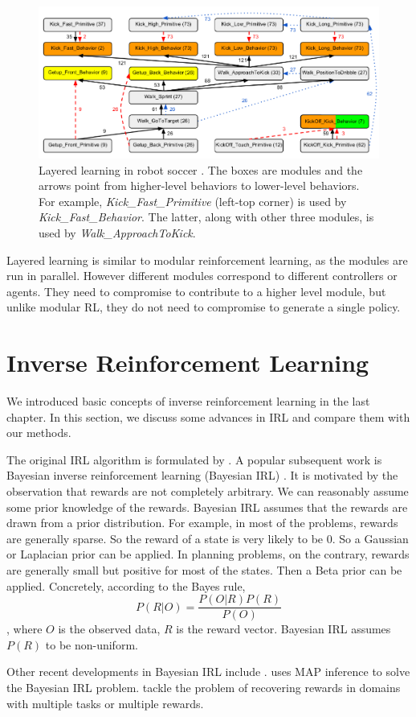 \begin{figure}[h]
\centering
\includegraphics[width=\textwidth]{layered}
\caption{Layered learning in robot soccer \cite{macalpine2015ut}. The boxes are
modules and the arrows point from higher-level behaviors to lower-level
behaviors. For example, \textit{Kick\_Fast\_Primitive} (left-top corner) is used
by  \textit{Kick\_Fast\_Behavior}. The latter, along with other three modules,
is used by \textit{Walk\_ApproachToKick}.}
\label{fig:soccer}
\end{figure}

Layered learning is similar to modular reinforcement learning, as the modules are
run in parallel. However different modules correspond to different controllers
or agents. They need to compromise to contribute to a higher level module, but
unlike modular RL, they do not need to compromise to generate a single policy.

\section{Inverse Reinforcement Learning}

We introduced basic concepts of inverse reinforcement learning in the last
chapter. In this section, we discuss some advances in IRL and compare them with
our methods.

The original IRL algorithm is formulated by
\cite{abbeel2004apprenticeship,ng2000algorithms}. A popular subsequent work is
Bayesian inverse reinforcement learning (Bayesian IRL) \cite{ramachandran2007bayesian}.
It is motivated by the
observation that rewards are not completely arbitrary. We can reasonably assume
some prior knowledge of the rewards. Bayesian IRL assumes that the rewards are
drawn from a prior distribution. 
For example, in most of the problems, rewards are generally sparse. So the
reward of a state is very likely to be 0. So a Gaussian or Laplacian prior can be
applied.  In planning problems, on the contrary, rewards are generally small but
positive for most of the states. Then a Beta prior can be applied.
Concretely, according to the Bayes rule,
$$P(R|O) = \frac{P(O|R)P(R)}{P(O)}$$
, where $O$ is the observed data, $R$ is the reward vector. Bayesian IRL assumes
$P(R)$ to be non-uniform.

Other recent developments in Bayesian IRL include
\cite{choi2011map,choi2012nonparametric,dimitrakakis2012bayesian}.
\cite{choi2011map} uses MAP inference to solve the Bayesian IRL problem.
\cite{choi2012nonparametric,dimitrakakis2012bayesian} tackle the problem of
recovering rewards in domains with multiple tasks or multiple rewards. 

